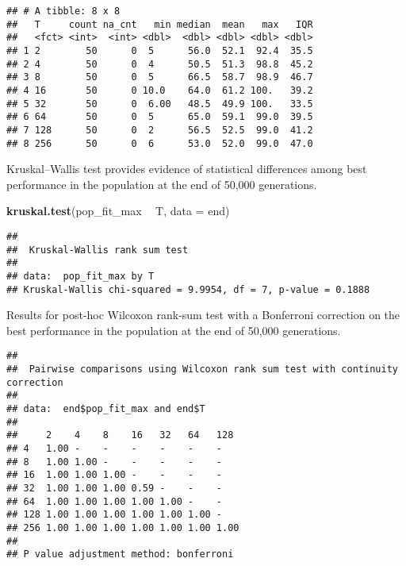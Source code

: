 \documentclass[]{book}
\newenvironment{Shaded}{\begin{snugshade}}{\end{snugshade}}
\newcommand{\DataTypeTok}[1]{\textcolor[rgb]{0.13,0.29,0.53}{#1}}
\newcommand{\KeywordTok}[1]{\textcolor[rgb]{0.13,0.29,0.53}{\textbf{#1}}}
\newcommand{\NormalTok}[1]{#1}
\newcommand{\OperatorTok}[1]{\textcolor[rgb]{0.81,0.36,0.00}{\textbf{#1}}}
\newcommand{\OtherTok}[1]{\textcolor[rgb]{0.56,0.35,0.01}{#1}}
\newcommand{\StringTok}[1]{\textcolor[rgb]{0.31,0.60,0.02}{#1}}
\begin{document}
\begin{verbatim}
## # A tibble: 8 x 8
##   T     count na_cnt   min median  mean   max   IQR
##   <fct> <int>  <int> <dbl>  <dbl> <dbl> <dbl> <dbl>
## 1 2        50      0  5      56.0  52.1  92.4  35.5
## 2 4        50      0  4      50.5  51.3  98.8  45.2
## 3 8        50      0  5      66.5  58.7  98.9  46.7
## 4 16       50      0 10.0    64.0  61.2 100.   39.2
## 5 32       50      0  6.00   48.5  49.9 100.   33.5
## 6 64       50      0  5      65.0  59.1  99.0  39.5
## 7 128      50      0  2      56.5  52.5  99.0  41.2
## 8 256      50      0  6      53.0  52.0  99.0  47.0
\end{verbatim}

Kruskal--Wallis test provides evidence of statistical differences among best performance in the population at the end of 50,000 generations.

\begin{Shaded}
\begin{Highlighting}[]
\KeywordTok{kruskal.test}\NormalTok{(pop_fit_max }\OperatorTok{~}\StringTok{ }\NormalTok{T, }\DataTypeTok{data =}\NormalTok{ end)}
\end{Highlighting}
\end{Shaded}

\begin{verbatim}
## 
##  Kruskal-Wallis rank sum test
## 
## data:  pop_fit_max by T
## Kruskal-Wallis chi-squared = 9.9954, df = 7, p-value = 0.1888
\end{verbatim}

Results for post-hoc Wilcoxon rank-sum test with a Bonferroni correction on the best performance in the population at the end of 50,000 generations.

\begin{Shaded}
\end{Shaded}

\begin{verbatim}
## 
##  Pairwise comparisons using Wilcoxon rank sum test with continuity correction 
## 
## data:  end$pop_fit_max and end$T 
## 
##     2    4    8    16   32   64   128 
## 4   1.00 -    -    -    -    -    -   
## 8   1.00 1.00 -    -    -    -    -   
## 16  1.00 1.00 1.00 -    -    -    -   
## 32  1.00 1.00 1.00 0.59 -    -    -   
## 64  1.00 1.00 1.00 1.00 1.00 -    -   
## 128 1.00 1.00 1.00 1.00 1.00 1.00 -   
## 256 1.00 1.00 1.00 1.00 1.00 1.00 1.00
## 
## P value adjustment method: bonferroni
\end{verbatim}
\end{document}
